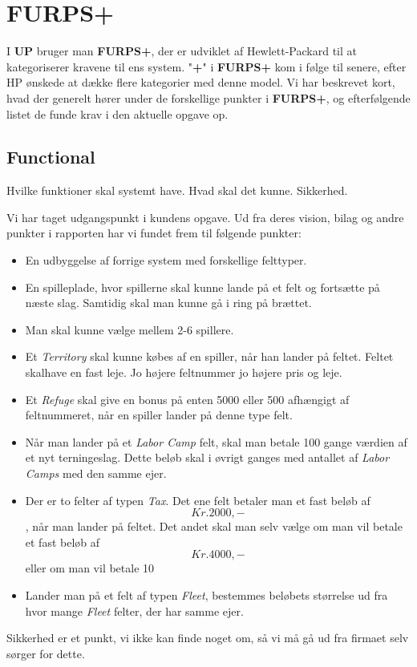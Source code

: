 \section{FURPS+}
I \textbf{UP} bruger man \textbf{FURPS+}, der er udviklet af Hewlett-Packard til at kategoriserer kravene til ens system. "\textbf{+}" i \textbf{FURPS+} kom i følge \cite{WikiFURPS} til senere, efter HP ønskede at dække flere kategorier med denne model. Vi har beskrevet kort, hvad der generelt hører under de forskellige punkter i \textbf{FURPS+}, og efterfølgende listet de funde krav i den aktuelle opgave op.
\subsection{Functional}
Hvilke funktioner skal systemt have. Hvad skal det kunne. Sikkerhed.


Vi har taget udgangspunkt i kundens \cite{CDIO3} opgave. Ud fra deres vision, bilag og andre punkter i rapporten har vi fundet frem til følgende punkter:
\begin{itemize}
\item En udbyggelse af forrige system med forskellige felttyper.
\item En spilleplade, hvor spillerne skal kunne lande på et felt og fortsætte på næste slag. Samtidig skal man kunne gå i ring på brættet.
\item Man skal kunne vælge mellem 2-6 spillere.
\item Et \textit{Territory} skal kunne købes af en spiller, når han lander på feltet. Feltet skalhave en fast leje. Jo højere feltnummer jo højere pris og leje.
\item Et \textit{Refuge} skal give en bonus på enten 5000 eller 500 afhængigt af feltnummeret, når en spiller lander på denne type felt.
\item Når man lander på et \textit{Labor Camp} felt, skal man betale 100 gange værdien af et nyt terningeslag. Dette beløb skal i øvrigt ganges med antallet af \textit{Labor Camps} med den samme ejer.
\item Der er to felter af typen \textit{Tax}. Det ene felt betaler man et fast beløb af $$Kr. 2000,-$$, når man lander på feltet. Det andet skal man selv vælge om man vil betale et fast beløb af $$Kr. 4000,-$$ eller om man vil betale $$10%
\item Lander man på et felt af typen \textit{Fleet}, bestemmes beløbets størrelse ud fra hvor mange \textit{Fleet} felter, der har samme ejer.
\end{itemize}
Sikkerhed er et punkt, vi ikke kan finde noget om, så vi må gå ud fra firmaet selv sørger for dette.
